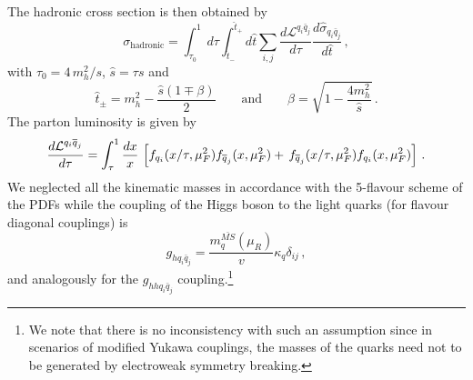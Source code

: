 The hadronic cross section is then obtained by
\begin{equation}
	\sigma_{\mathrm{hadronic}} =  \int_{\tau_0}^1 d\tau \int_{\hat{t}_-}^{\hat{t}_+} d\hat{t} \sum_{i,j} \frac{d\mathcal{L}^{q_i\bar{q}_j}}{d\tau}\frac{ d\hat \sigma_{q_i\bar{q}_j}}{d \hat t}\,, \label{eq:sigmahadron}
\end{equation}
with $ \tau_0= 4\, m_h^2/s$, $\hat{s}=\tau s$ and
\begin{equation}
	\hat{t}_{\pm}=m_h^2-\frac{\hat{s}(1\mp \beta)}{2} \quad\quad \text{and}\quad \quad \beta=\sqrt{1-\frac{4 m_h^2}{\hat{s}}}\,.
\end{equation}
The parton luminosity is given by
\begin{equation}
	\frac{d{\cal L}^{q_i \bar q_j}}{d\tau} = \int_\tau ^1 \frac{dx}{x} \,\left[  f_{q_i}(x/\tau,\mu_F^2) f_{\bar{q}_j}(x,\mu_F^2) + \,f_{\bar{q}_j}(x/\tau,\mu_F^2) f_{q_i}(x,\mu_F^2)\right]\,.
\end{equation}
We neglected all the kinematic masses in accordance with the 5-flavour scheme of the PDFs while the coupling of the Higgs boson to the light quarks (for flavour diagonal couplings) is
\begin{equation}
	g_{hq_i\bar{q}_j}=\frac{m^{\bar{MS}}_q(\mu_R)}{v}  \kappa_q \delta_{ij}\,,
\end{equation}
and analogously for the $g_{hhq_i\bar{q}_j}$ coupling.\footnote{We note that there is no inconsistency with such an assumption since in scenarios of modified Yukawa couplings, the masses of the quarks need not to be generated by electroweak symmetry breaking.}
%
